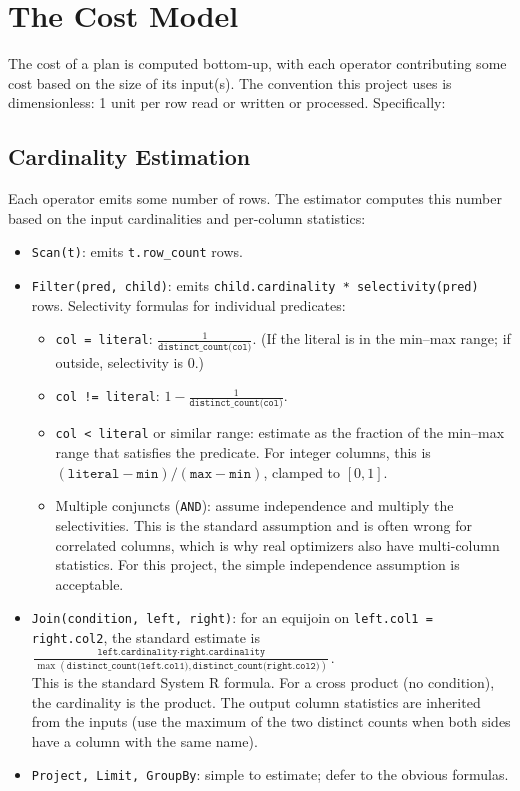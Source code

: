 \documentclass[11pt,a4paper]{article}
\begin{document}
\section{The Cost Model}

The cost of a plan is computed bottom-up, with each operator contributing some cost based on the size of its input(s). The convention this project uses is dimensionless: 1 unit per row read or written or processed. Specifically:

\subsection{Cardinality Estimation}
Each operator emits some number of rows. The estimator computes this number based on the input cardinalities and per-column statistics:

\begin{itemize}
\item \texttt{Scan(t)}: emits \texttt{t.row\_count} rows.
\item \texttt{Filter(pred, child)}: emits \texttt{child.cardinality * selectivity(pred)} rows. Selectivity formulas for individual predicates:
\begin{itemize}
\item \texttt{col = literal}: $\frac{1}{\texttt{distinct\_count(col)}}$. (If the literal is in the min--max range; if outside, selectivity is 0.)
\item \texttt{col != literal}: $1 - \frac{1}{\texttt{distinct\_count(col)}}$.
\item \texttt{col < literal} or similar range: estimate as the fraction of the min--max range that satisfies the predicate. For integer columns, this is $(\texttt{literal} - \texttt{min}) / (\texttt{max} - \texttt{min})$, clamped to $[0, 1]$.
\item Multiple conjuncts (\texttt{AND}): assume independence and multiply the selectivities. This is the standard assumption and is often wrong for correlated columns, which is why real optimizers also have multi-column statistics. For this project, the simple independence assumption is acceptable.
\end{itemize}
\item \texttt{Join(condition, left, right)}: for an equijoin on \texttt{left.col1 = right.col2}, the standard estimate is \\
$\frac{\texttt{left.cardinality} \cdot \texttt{right.cardinality}}{\max(\texttt{distinct\_count(left.col1)}, \texttt{distinct\_count(right.col2)})}$. \\
This is the standard System R formula. For a cross product (no condition), the cardinality is the product. The output column statistics are inherited from the inputs (use the maximum of the two distinct counts when both sides have a column with the same name).
\item \texttt{Project, Limit, GroupBy}: simple to estimate; defer to the obvious formulas.
\end{itemize}
\end{document}
